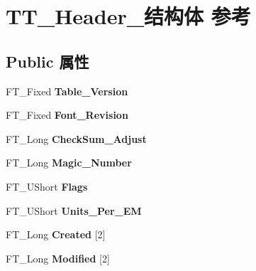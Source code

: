 \hypertarget{struct_t_t___header__}{}\section{T\+T\+\_\+\+Header\+\_\+结构体 参考}
\label{struct_t_t___header__}
\subsection*{Public 属性}
\begin{DoxyCompactItemize}
\item 
\mbox{\label{struct_t_t___header___ab14622e8f8f80ee8361f4847cf9c36e1}} 
F\+T\+\_\+\+Fixed {\bfseries Table\+\_\+\+Version}
\item 
\mbox{\label{struct_t_t___header___aa5d0f9f88a7ffc755982a1a9dbb58f21}} 
F\+T\+\_\+\+Fixed {\bfseries Font\+\_\+\+Revision}
\item 
\mbox{\label{struct_t_t___header___a5ca008fa01e9568769287febc2abd807}} 
F\+T\+\_\+\+Long {\bfseries Check\+Sum\+\_\+\+Adjust}
\item 
\mbox{\label{struct_t_t___header___a24e0dde7596c7303c8b8872feb1c221f}} 
F\+T\+\_\+\+Long {\bfseries Magic\+\_\+\+Number}
\item 
\mbox{\label{struct_t_t___header___a9e81d0e6bf9a83ebf28f768d83559f38}} 
F\+T\+\_\+\+U\+Short {\bfseries Flags}
\item 
\mbox{\label{struct_t_t___header___a594567319e6b6b5a823567279d26857d}} 
F\+T\+\_\+\+U\+Short {\bfseries Units\+\_\+\+Per\+\_\+\+EM}
\item 
\mbox{\label{struct_t_t___header___a1e5d99f35ae2a604c6f54da94dc5105f}} 
F\+T\+\_\+\+Long {\bfseries Created} \mbox{[}2\mbox{]}
\item 
\mbox{\label{struct_t_t___header___a48db8e244aee26da683240e67644619e}} 
F\+T\+\_\+\+Long {\bfseries Modified} \mbox{[}2\mbox{]}
\item 
\mbox{\label{struct_t_t___header___ae4553d76427d9f7a28595ed71897dcbb}} 

\end{DoxyCompactItemize}
